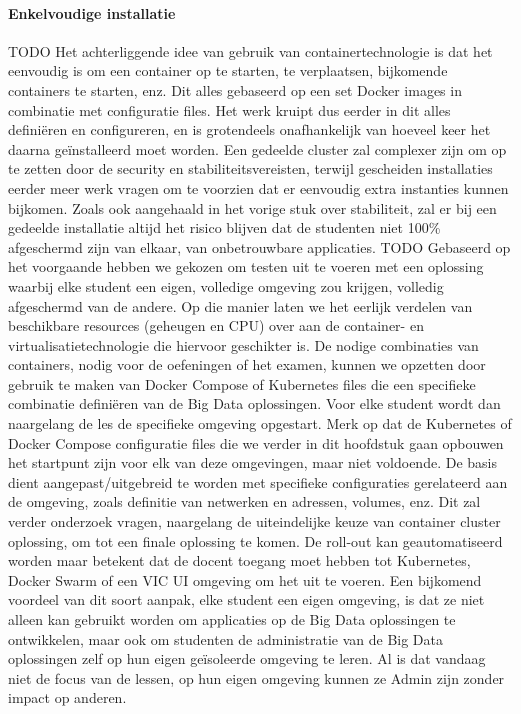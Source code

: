 \paragraph{Enkelvoudige installatie} TODO
Het achterliggende idee van gebruik van containertechnologie is dat het eenvoudig is om een container op te starten, te verplaatsen, bijkomende containers te starten, enz. Dit alles gebaseerd op een set Docker images in combinatie met configuratie files.
\newline
Het werk kruipt dus eerder in dit alles definiëren en configureren, en is grotendeels onafhankelijk van hoeveel keer het daarna geïnstalleerd moet worden. Een gedeelde cluster zal complexer zijn om op te zetten door de security en stabiliteitsvereisten, terwijl gescheiden installaties eerder meer werk vragen om te voorzien dat er eenvoudig extra instanties kunnen bijkomen.
\newline
Zoals ook aangehaald in het vorige stuk over stabiliteit, zal er bij een gedeelde installatie altijd het risico blijven dat de studenten niet 100\% afgeschermd zijn van elkaar, van onbetrouwbare applicaties. TODO
\newline
\newline
\newline
Gebaseerd op het voorgaande hebben we gekozen om testen uit te voeren met een oplossing waarbij elke student een eigen, volledige omgeving zou krijgen, volledig afgeschermd van de andere. Op die manier laten we het eerlijk verdelen van beschikbare resources (geheugen en CPU) over aan de container- en virtualisatietechnologie die hiervoor geschikter is.
\newline
De nodige combinaties van containers, nodig voor de oefeningen of het examen, kunnen we opzetten door gebruik te maken van Docker Compose of Kubernetes files die een specifieke combinatie definiëren van de Big Data oplossingen. Voor elke student wordt dan naargelang de les de specifieke omgeving opgestart.
\newline
Merk op dat de Kubernetes of Docker Compose configuratie files die we verder in dit hoofdstuk gaan opbouwen het startpunt zijn voor elk van deze omgevingen, maar niet voldoende. De basis dient aangepast/uitgebreid te worden met specifieke configuraties gerelateerd aan de omgeving, zoals definitie van netwerken en adressen, volumes, enz. Dit zal verder onderzoek vragen, naargelang de uiteindelijke keuze van container cluster oplossing, om tot een finale oplossing te komen.
\newline
De roll-out kan geautomatiseerd worden maar betekent dat de docent toegang moet hebben tot Kubernetes, Docker Swarm of een VIC UI omgeving om het uit te voeren.
\newline
Een bijkomend voordeel van dit soort aanpak, elke student een eigen omgeving, is dat ze niet alleen kan gebruikt worden om applicaties op de Big Data oplossingen te ontwikkelen, maar ook om studenten de administratie van de Big Data oplossingen zelf op hun eigen geïsoleerde omgeving te leren. Al is dat vandaag niet de focus van de lessen, op hun eigen omgeving kunnen ze Admin zijn zonder impact op anderen.
\newline
\newline


